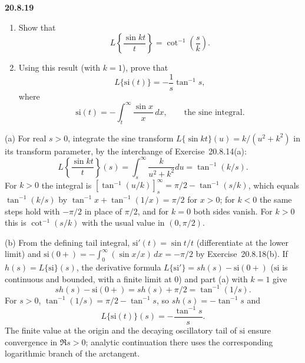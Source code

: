 \par\bigskip
\noindent\textbf{20.8.19}
\begin{enumerate}
\item[(a)] Show that
\[
L\left\{\frac{\sin kt}{t}\right\}=\cot^{-1}\left(\frac{s}{k}\right).
\]
\item[(b)] Using this result (with $k=1$), prove that
\[
L\{\mathrm{si}(t)\}=-\frac{1}{s}\tan^{-1}s,
\]
where
\[
\mathrm{si}(t)=-\int_{t}^{\infty}\frac{\sin x}{x}\,dx,
\qquad\text{the sine integral.}
\]
\end{enumerate}
\par{}
\solution
(a) For real $s>0$, integrate the sine transform
$L\{\sin kt\}(u)=k/(u^2+k^2)$ in its transform parameter, by
the interchange of Exercise~20.8.14(a):
\[
L\left\{\frac{\sin kt}{t}\right\}(s)
=\int_s^\infty\frac{k}{u^2+k^2}du
=\boxed{\tan^{-1}(k/s)}.
\]
For $k>0$ the integral is
$[\tan^{-1}(u/k)]_s^\infty=\pi/2-\tan^{-1}(s/k)$, which equals
$\tan^{-1}(k/s)$ by $\tan^{-1}x+\tan^{-1}(1/x)=\pi/2$ for $x>0$;
for $k<0$ the same steps hold with $-\pi/2$ in place of $\pi/2$,
and for $k=0$ both sides vanish.
For $k>0$ this is $\cot^{-1}(s/k)$ with the usual value in
$(0,\pi/2)$.

(b) From the defining tail integral,
$\mathrm{si}'(t)=\sin t/t$ (differentiate at the lower limit)
and $\mathrm{si}(0+)=-\int_0^\infty(\sin x/x)\,dx=-\pi/2$ by
Exercise~20.8.18(b). If $h(s)=L\{\mathrm{si}\}(s)$,
the derivative formula $L\{\mathrm{si}'\}=sh(s)-\mathrm{si}(0+)$
($\mathrm{si}$ is continuous and bounded, with a finite limit at
$0$) and part (a) with $k=1$ give
\[
s h(s)-\mathrm{si}(0+)
=s h(s)+\pi/2=\tan^{-1}(1/s).
\]
For $s>0$, $\tan^{-1}(1/s)=\pi/2-\tan^{-1}s$, so
$sh(s)=-\tan^{-1}s$ and
\[
\boxed{L\{\mathrm{si}(t)\}(s)=-\frac{\tan^{-1}s}{s}}.
\]
The finite value at the origin and the decaying oscillatory
tail of $\mathrm{si}$ ensure convergence in $\Re s>0$;
analytic continuation there uses the corresponding logarithmic
branch of the arctangent.

